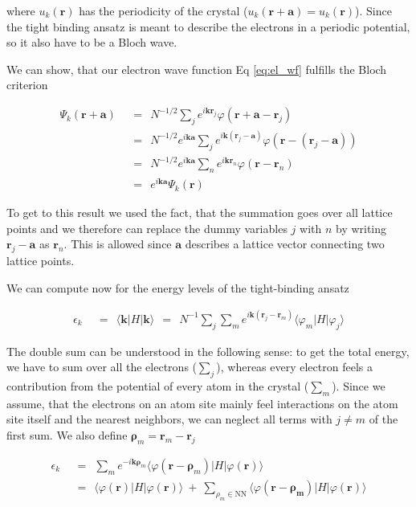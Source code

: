 \documentclass[10pt]{report}
\numberwithin{equation}{chapter}
\newcommand{\refEq}[1]{
  Eq  \ref{#1}
}
\begin{document}
where $u_k(\mathbf{r})$ has the periodicity of the crystal ($u_k(\mathbf{r} + \mathbf{a}) = u_k(\mathbf{r})$). Since the tight binding ansatz is meant to describe the electrons in a periodic potential, so it also have to be a Bloch wave. 


We can show, that our electron wave function \refEq{eq:el_wf} fulfills the Bloch criterion


\begin{align}
  \Psi_k(\mathbf{r} + \mathbf{a}) 
  ~~& =~~ N^{-1/2} \sum_j e^{i \mathbf{k} \mathbf{r}_j} \varphi(\mathbf{r} + \mathbf{a} - \mathbf{r}_j) \nonumber \\
  ~~& =~~ N^{-1/2} e^{i\mathbf{k} \mathbf{a}} 
  \sum_j e^{i\mathbf{k} (\mathbf{r}_j - \mathbf{a})} \varphi(\mathbf{r} - (\mathbf{r}_j-\mathbf{a})) \nonumber \\
  ~~& =~~ N^{-1/2} e^{i\mathbf{k} \mathbf{a}}
  \sum_n e^{i\mathbf{k} \mathbf{r}_n} \varphi(\mathbf{r} - \mathbf{r}_n) \nonumber \\
  ~~& =~~ e^{i\mathbf{k} \mathbf{a}} \Psi_k(\mathbf{r})
\end{align}

To get to this result we used the fact, that the summation goes over all lattice points and we therefore can replace the dummy variables $j$ with $n$ by writing $\mathbf{r}_j - \mathbf{a}$ as $\mathbf{r}_n$. This is allowed since $\mathbf{a}$ describes a lattice vector connecting two lattice points.

We can compute now for the energy levels of the tight-binding ansatz

\begin{align}
  \epsilon_k ~~& =~~ \langle \mathbf{k} | H | \mathbf{k} \rangle ~~=~~
  N^{-1} \sum_j \sum_m e^{i\mathbf{k} (\mathbf{r}_j - \mathbf{r}_m)} 
  \langle \varphi_m | H | \varphi_j \rangle 
\end{align}

The double sum can be understood in the following sense: to get the total energy, we have to sum over all the electrons ($\sum_j$), whereas every electron feels a contribution from the potential of every atom in the crystal ($\sum_m$). Since we assume, that the electrons on an atom site mainly feel interactions on the atom site itself and the nearest neighbors, we can neglect all terms with $j \neq m$ of the first sum. We also define $\mathbf{\rho}_m = \mathbf{r}_m - \mathbf{r}_j$

\begin{align} \label{eq:tb_der}
  \epsilon_k ~~& =~~ \sum_m e^{-i\mathbf{k} \mathbf{\rho}_m} \langle \varphi(\mathbf{r}-\mathbf{\rho}_m) | H | \varphi(\mathbf{r}) \rangle \nonumber \\
  ~~& =~~ \langle \varphi(\mathbf{r}) |H| \varphi(\mathbf{r}) \rangle 
  ~+~ \sum_{\rho_m \in \text{NN}} \langle \varphi(\mathbf{r} - \mathbf{\rho_m}) |H| \varphi(\mathbf{r}) \rangle
\end{align}
\end{document}

